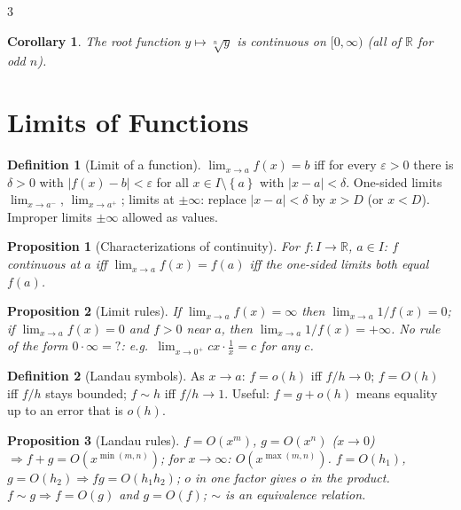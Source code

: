 \documentclass[10pt,a4paper,landscape]{article}
\theoremstyle{definition}
\newtheorem{defn}{Definition}[section]
\theoremstyle{plain}
\newtheorem{prop}{Proposition}[section]
\newtheorem{cor}{Corollary}[section]
\theoremstyle{remark}
\newcommand{\R}{\mathbb{R}}
\newcommand{\eps}{\varepsilon}
\newcommand{\abs}[1]{\lvert #1 \rvert}
\newcommand{\set}[1]{\left\{ #1 \right\}}
\newcommand{\oo}{\infty}
\begin{document}
\begin{multicols*}{3}
\begin{cor}
The root function $y \mapsto \sqrt[n]{y}$ is continuous on $[0,\oo)$ (all of $\R$ for odd $n$).
\end{cor}

\section{Limits of Functions}

\begin{defn}[Limit of a function]
$\lim_{x \to a} f(x) = b$ iff for every $\eps>0$ there is $\delta>0$ with $\abs{f(x)-b} < \eps$ for all $x \in I \setminus \set{a}$ with $\abs{x-a} < \delta$. One-sided limits $\lim_{x \to a^-}$, $\lim_{x \to a^+}$; limits at $\pm\oo$: replace $\abs{x-a}<\delta$ by $x > D$ (or $x < D$). Improper limits $\pm\oo$ allowed as values.
\end{defn}

\begin{prop}[Characterizations of continuity]
For $f: I \to \R$, $a \in I$: $f$ continuous at $a$ iff $\lim_{x \to a} f(x) = f(a)$ iff the one-sided limits both equal $f(a)$.
\end{prop}

\begin{prop}[Limit rules]
If $\lim_{x \to a} f(x) = \oo$ then $\lim_{x \to a} 1/f(x) = 0$; if $\lim_{x \to a} f(x) = 0$ and $f > 0$ near $a$, then $\lim_{x \to a} 1/f(x) = +\oo$. No rule of the form $0 \cdot \oo = ?$: e.g.\ $\lim_{x \to 0^+} c x \cdot \frac{1}{x} = c$ for any $c$.
\end{prop}

\begin{defn}[Landau symbols]
As $x \to a$: $f = o(h)$ iff $f/h \to 0$; $f = O(h)$ iff $f/h$ stays bounded; $f \sim h$ iff $f/h \to 1$. Useful: $f = g + o(h)$ means equality up to an error that is $o(h)$.
\end{defn}

\begin{prop}[Landau rules]
$f = O(x^m)$, $g = O(x^n)$ ($x \to 0$) $\Rightarrow f+g = O(x^{\min(m,n)})$; for $x \to \oo$: $O(x^{\max(m,n)})$. $f = O(h_1)$, $g = O(h_2) \Rightarrow fg = O(h_1 h_2)$; $o$ in one factor gives $o$ in the product. $f \sim g \Rightarrow f = O(g)$ and $g = O(f)$; $\sim$ is an equivalence relation.
\end{prop}


\end{multicols*}
\end{document}
